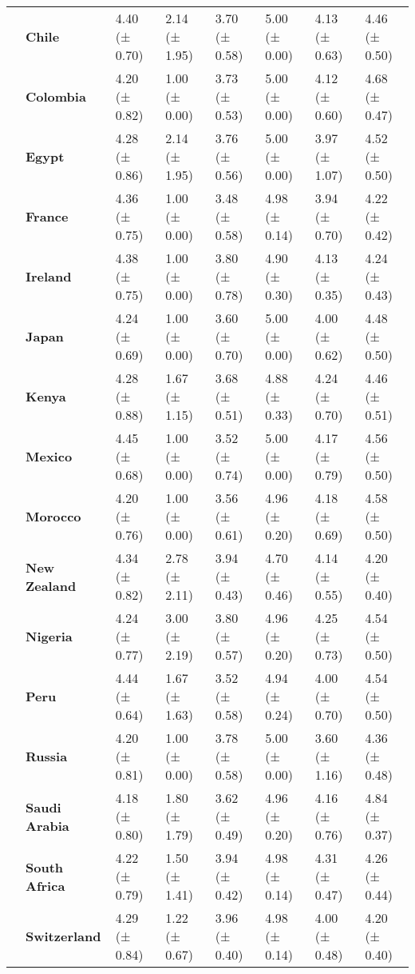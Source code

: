 \begin{longtable}{llllllll}
\textbf{} & \textbf{Chile} & 4.40 (± 0.70) & 2.14 (± 1.95) & 3.70 (± 0.58) & 5.00 (± 0.00) & 4.13 (± 0.63) & 4.46 (± 0.50) \\
\textbf{} & \textbf{Colombia} & 4.20 (± 0.82) & 1.00 (± 0.00) & 3.73 (± 0.53) & 5.00 (± 0.00) & 4.12 (± 0.60) & 4.68 (± 0.47) \\
\textbf{} & \textbf{Egypt} & 4.28 (± 0.86) & 2.14 (± 1.95) & 3.76 (± 0.56) & 5.00 (± 0.00) & 3.97 (± 1.07) & 4.52 (± 0.50) \\
\textbf{} & \textbf{France} & 4.36 (± 0.75) & 1.00 (± 0.00) & 3.48 (± 0.58) & 4.98 (± 0.14) & 3.94 (± 0.70) & 4.22 (± 0.42) \\
\textbf{} & \textbf{Ireland} & 4.38 (± 0.75) & 1.00 (± 0.00) & 3.80 (± 0.78) & 4.90 (± 0.30) & 4.13 (± 0.35) & 4.24 (± 0.43) \\
\textbf{} & \textbf{Japan} & 4.24 (± 0.69) & 1.00 (± 0.00) & 3.60 (± 0.70) & 5.00 (± 0.00) & 4.00 (± 0.62) & 4.48 (± 0.50) \\
\textbf{} & \textbf{Kenya} & 4.28 (± 0.88) & 1.67 (± 1.15) & 3.68 (± 0.51) & 4.88 (± 0.33) & 4.24 (± 0.70) & 4.46 (± 0.51) \\
\textbf{} & \textbf{Mexico} & 4.45 (± 0.68) & 1.00 (± 0.00) & 3.52 (± 0.74) & 5.00 (± 0.00) & 4.17 (± 0.79) & 4.56 (± 0.50) \\
\textbf{} & \textbf{Morocco} & 4.20 (± 0.76) & 1.00 (± 0.00) & 3.56 (± 0.61) & 4.96 (± 0.20) & 4.18 (± 0.69) & 4.58 (± 0.50) \\
\textbf{} & \textbf{New Zealand} & 4.34 (± 0.82) & 2.78 (± 2.11) & 3.94 (± 0.43) & 4.70 (± 0.46) & 4.14 (± 0.55) & 4.20 (± 0.40) \\
\textbf{} & \textbf{Nigeria} & 4.24 (± 0.77) & 3.00 (± 2.19) & 3.80 (± 0.57) & 4.96 (± 0.20) & 4.25 (± 0.73) & 4.54 (± 0.50) \\
\textbf{} & \textbf{Peru} & 4.44 (± 0.64) & 1.67 (± 1.63) & 3.52 (± 0.58) & 4.94 (± 0.24) & 4.00 (± 0.70) & 4.54 (± 0.50) \\
\textbf{} & \textbf{Russia} & 4.20 (± 0.81) & 1.00 (± 0.00) & 3.78 (± 0.58) & 5.00 (± 0.00) & 3.60 (± 1.16) & 4.36 (± 0.48) \\
\textbf{} & \textbf{Saudi Arabia} & 4.18 (± 0.80) & 1.80 (± 1.79) & 3.62 (± 0.49) & 4.96 (± 0.20) & 4.16 (± 0.76) & 4.84 (± 0.37) \\
\textbf{} & \textbf{South Africa} & 4.22 (± 0.79) & 1.50 (± 1.41) & 3.94 (± 0.42) & 4.98 (± 0.14) & 4.31 (± 0.47) & 4.26 (± 0.44) \\
\textbf{} & \textbf{Switzerland} & 4.29 (± 0.84) & 1.22 (± 0.67) & 3.96 (± 0.40) & 4.98 (± 0.14) & 4.00 (± 0.48) & 4.20 (± 0.40) \\

\end{longtable}
